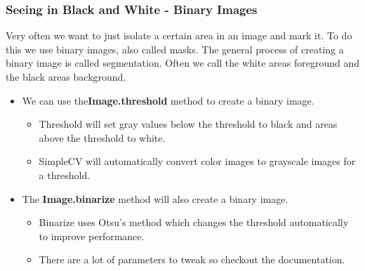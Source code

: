 \documentclass{beamer}
\begin{document}
\begin{frame}
\frametitle{Seeing in Black and White - Binary Images}
\small{Very often we want to just isolate a certain area in an image and mark
it. To do this we use binary images, also called masks. The general
process of creating a binary image is called segmentation. Often we call
the white areas foreground and the black areas background. }
\begin{itemize}
\item We can use the\textbf{Image.threshold} method to create a binary
  image. 
  \begin{itemize}
  \item Threshold will set gray values below the threshold to black
    and areas above the threshold to white.
  \item SimpleCV will automatically convert color images to grayscale
    images for a threshold.
  \end{itemize}
\item The \textbf{Image.binarize} method will also create a binary
  image.
   \begin{itemize}
   \item Binarize uses Otsu's method which changes the threshold
     automatically to improve performance. 
   \item There are a lot of parameters to tweak so checkout the
     documentation.
  \end{itemize}
\end{itemize}
\end{frame}
\end{document}

